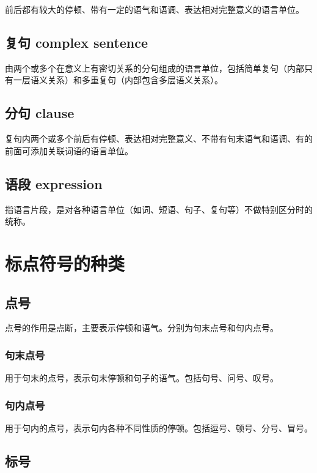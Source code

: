 \documentclass[a4paper]{article}
\begin{document}
前后都有较大的停顿、带有一定的语气和语调、表达相对完整意义的语言单位。

\subsection{复句 complex sentence}

由两个或多个在意义上有密切关系的分句组成的语言单位，包括简单复句（内部只有一层语义关系）和多重复句（内部包含多层语义关系）。

\subsection{分句 clause}

复句内两个或多个前后有停顿、表达相对完整意义、不带有句末语气和语调、有的前面可添加关联词语的语言单位。

\subsection{语段 expression}

指语言片段，是对各种语言单位（如词、短语、句子、复句等）不做特别区分时的统称。

\section{标点符号的种类}

\subsection{点号}

点号的作用是点断，主要表示停顿和语气。分别为句末点号和句内点号。

\subsubsection{句末点号}

用于句末的点号，表示句末停顿和句子的语气。包括句号、问号、叹号。

\subsubsection{句内点号}

用于句内的点号，表示句内各种不同性质的停顿。包括逗号、顿号、分号、冒号。

\subsection{标号}
\end{document}
